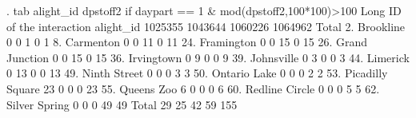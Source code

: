 . tab alight_id dpstoff2 if daypart == 1 \& mod(dpstoff2,100*100)>100
{\smallskip}
                     {\VBAR}         Long ID of the interaction
           alight_id {\VBAR}   1025355    1043644    1060226    1064962 {\VBAR}     Total
        2. Brookline {\VBAR}         0          0          1          0 {\VBAR}         1 
        8. Carmenton {\VBAR}         0          0         11          0 {\VBAR}        11 
      24. Framington {\VBAR}         0          0         15          0 {\VBAR}        15 
  26. Grand Junction {\VBAR}         0          0         15          0 {\VBAR}        15 
      36. Irvingtown {\VBAR}         0          9          0          0 {\VBAR}         9 
      39. Johnsville {\VBAR}         0          3          0          0 {\VBAR}         3 
        44. Limerick {\VBAR}         0         13          0          0 {\VBAR}        13 
    49. Ninth Street {\VBAR}         0          0          0          3 {\VBAR}         3 
    50. Ontario Lake {\VBAR}         0          0          0          2 {\VBAR}         2 
53. Picadilly Square {\VBAR}        23          0          0          0 {\VBAR}        23 
      55. Queens Zoo {\VBAR}         6          0          0          0 {\VBAR}         6 
  60. Redline Circle {\VBAR}         0          0          0          5 {\VBAR}         5 
   62. Silver Spring {\VBAR}         0          0          0         49 {\VBAR}        49 
               Total {\VBAR}        29         25         42         59 {\VBAR}       155 
{\smallskip}
{\smallskip}
